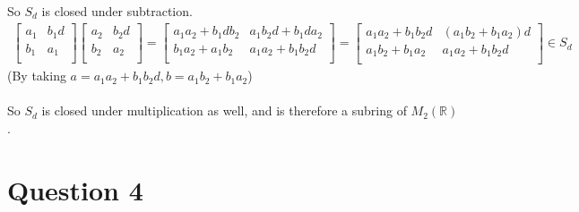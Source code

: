 \documentclass{article}
\begin{document}
So \(S_d\) is closed under subtraction.
\begin{align*}
\left[ {\begin{array}{cc}
   a_1 & b_1 d \\
   b_1 & a_1 \\
  \end{array} } \right]
  \left[ {\begin{array}{cc}
   a_2 & b_2 d \\
   b_2 & a_2 \\
  \end{array} } \right] = 
  \left[ {\begin{array}{cc}
   a_1 a_2 + b_1 d b_2 & a_1 b_2 d + b_1 d a_2 \\
   b_1 a_2 + a_1 b_2  & a_1 a_2 + b_1 b_2 d \\
  \end{array} } \right] = \left[ {\begin{array}{cc}
   a_1 a_2 + b_1 b_2 d & (a_1 b_2 + b_1 a_2)d \\
   a_1 b_2 + b_1 a_2 & a_1 a_2 + b_1 b_2 d \\
  \end{array} } \right] \in S_d
\end{align*}
(By taking \(a = a_1 a_2 + b_1 b_2 d, b = a_1 b_2 + b_1 a_2\))
\\\\
So \(S_d\) is closed under multiplication as well, and is therefore a subring of \(M_2(\mathds{R})\).

\section*{Question 4}
\end{document}
